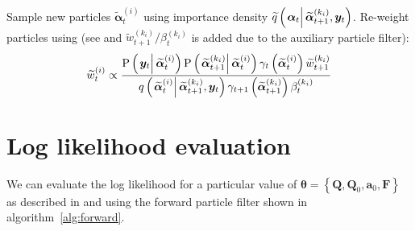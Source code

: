 \documentclass[9pt, notitlepage]{article}
\newcommand\StateX{\Statex\hspace{\algorithmicindent}}
\renewcommand{\vec}[1]{\bm{#1}}
\newcommand{\mat}[1]{\mathbf{#1}}
\newcommand{\Lbrace}[1]{\left\{ #1\right\}}
\newcommand{\Lparen}[1]{\left( #1\right)}
\newcommand{\Cond}[2]{\left. #1 \vphantom{#2} \right\vert  #2}
\newcommand{\Prob}{\text{P}}
\newcommand{\optor}[2]{#1\Lparen{#2}}
\newcommand{\optorC}[3]{\optor{#1}{\Cond{#2}{#3}}}
\newcommand{\propC}[2]{\optorC{\Prob}{#1}{#2}}
\newcommand{\IDC}[2]{\optorC{q}{#1}{#2}}
\newcommand{\IDAproxC}[2]{\optorC{\widetilde{q}}{#1}{#2}}
\newcommand{\partic}[3]{#1_{#2}^{\Lparen{#3}}}
\newcommand{\particB}[3]{\widetilde{#1}_{#2}^{\Lparen{#3}}}
\begin{document}
\begin{algorithm}[H]
\begin{algorithmic}[1]
\State Sample new particles $\particB{\vec{\alpha}}{t}{i}$ using importance density $\IDAproxC{\vec{\alpha}_t}{\particB{\vec{\alpha}}{t + 1}{k_i}, \vec{y}_t}$.
\EndProcedure
%
\State Re-weight particles using (see \citet[page 72]{briers10} and $\particB{w}{t + 1}{k_i}/\partic{\beta}{t}{k_i}$ is added due to the auxiliary particle filter):
\StateX \begin{equation}\label{eqn:backwardWeight}
	\particB{w}{t}{i} \propto \frac{
		\propC{\vec{y}_t}{\particB{\vec{\alpha}}{t}{i}}
		\propC{\particB{\vec{\alpha}}{t + 1}{k_i}}{\particB{\vec{\alpha}}{t}{i}}
		\gamma_t\Lparen{\particB{\vec{\alpha}}{t}{i}}
		\particB{w}{t + 1}{k_i}
	}{ %
		\IDC{\particB{\vec{\alpha}}{t}{i}}{\particB{\vec{\alpha}}{t + 1}{k_i}, \vec{y}_t}
		\gamma_{t + 1}\Lparen{\particB{\vec{\alpha}}{t + 1}{k_i}}
		\partic{\beta}{t}{k_i}
	}
\end{equation}
\EndProcedure
\EndFor
\end{algorithmic}
\end{algorithm}

\newpage

\section{Log likelihood evaluation}
We can evaluate the log likelihood for a particular value of $\vec{\theta} = \Lbrace{\mat{Q}, \mat{Q}_0, \vec{a}_0, \mat{F}}$ as described in \citet[page 5]{doucet09} and \citet[page 193]{malik11} using the forward particle filter shown in algorithm~\ref{alg:forward}.
\end{document}
